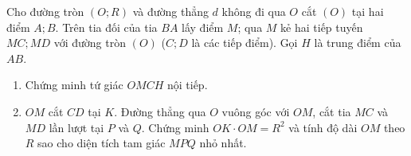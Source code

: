 \begin{ex}
	Cho đường tròn $(O;R)$ và đường thẳng $d$ không đi qua $O$ cắt $(O)$ tại hai điểm $A; B$. Trên tia đối của tia $BA$ lấy điểm $M$; qua $M$ kẻ hai tiếp tuyến $MC; MD$ với đường tròn $(O)$ ($C; D$ là các tiếp điểm). Gọi $H$ là trung điểm của $AB$.
	\begin{enumerate}
		\item[a)] Chứng minh tứ giác $OMCH$ nội tiếp.
		\item[b)] $OM$ cắt $CD$ tại $K$. Đường thẳng qua $O$ vuông góc với $OM$, cắt tia $MC$ và $MD$ lần lượt tại $P$ và $Q$. Chứng minh $OK \cdot OM = R^2$ và tính độ dài $OM$ theo $R$ sao cho diện tích tam giác $MPQ$ nhỏ nhất.
	\end{enumerate}
\end{ex}
